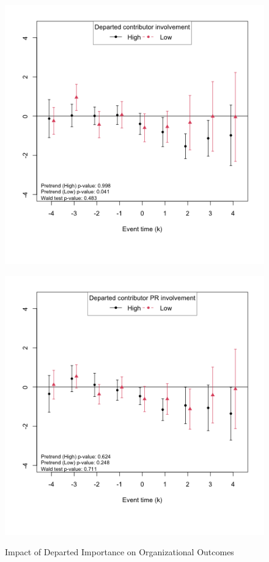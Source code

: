 \begin{figure}[htbp]   
    \caption{Impact of Departed Importance on Organizational Outcomes} \label{fig:prs_opened_more_imp}
    \centering
    \begin{minipage}[b]{0.49\textwidth}
        \centering
            \label{fig:prs_opened_involved}
        \includegraphics[width=\textwidth]{temp/output/collab/prs_opened_involved_cs_norm.png}
    \end{minipage}
    \begin{minipage}[b]{0.49\textwidth}
        \centering
            \label{fig:prs_opened_pr_involved}
        \includegraphics[width=\textwidth]{temp/output/collab/prs_opened_departed_opened_cs_norm.png}

\end{minipage}
\end{figure}
